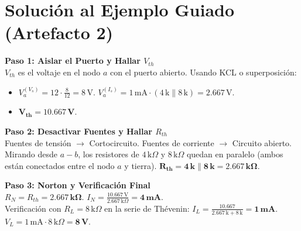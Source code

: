 \documentclass[11pt, a4paper]{article}
\begin{document}
\begin{tcolorbox}[colback=ucbblue!5!white, colframe=ucbblue, title=\textbf{Clave de Evaluación Docente: Thévenin, Norton y Superposición}]
\end{tcolorbox}

\section*{Solución al Ejemplo Guiado (Artefacto 2)}
\textbf{Paso 1: Aislar el Puerto y Hallar $V_{th}$}\\
$V_{th}$ es el voltaje en el nodo $a$ con el puerto abierto. Usando KCL o superposición:
\begin{itemize}
    \item $V_a^{(V_s)} = 12 \cdot \frac{8}{12} = 8\,\text{V}$. \quad $V_a^{(I_s)} = 1\,\text{mA} \cdot (4\,\text{k} \parallel 8\,\text{k}) = 2.667\,\text{V}$.
    \item $\mathbf{V_{th} = 10.667\,\text{V}}$.
\end{itemize}

\noindent\textbf{Paso 2: Desactivar Fuentes y Hallar $R_{th}$}\\
Fuentes de tensión $\rightarrow$ Cortocircuito. Fuentes de corriente $\rightarrow$ Circuito abierto.
Mirando desde $a-b$, los resistores de $4\,\text{k}\Omega$ y $8\,\text{k}\Omega$ quedan en paralelo (ambos están conectados entre el nodo $a$ y tierra).
$\mathbf{R_{th} = 4\,\text{k} \parallel 8\,\text{k} = 2.667\,\text{k}\Omega}$.

\noindent\textbf{Paso 3: Norton y Verificación Final}\\
$R_N = R_{th} = \mathbf{2.667\,\text{k}\Omega}$. \quad $I_N = \frac{10.667\,\text{V}}{2.667\,\text{k}\Omega} = \mathbf{4\,\text{mA}}$. \\
Verificación con $R_L = 8\,\text{k}\Omega$ en la serie de Thévenin:
$I_L = \frac{10.667}{2.667\,\text{k} + 8\,\text{k}} = \mathbf{1\,\text{mA}}$. $V_L = 1\,\text{mA} \cdot 8\,\text{k}\Omega = \mathbf{8\,\text{V}}$.
\end{document}
